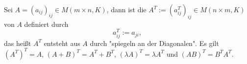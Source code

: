\begin{definition}
	\label{def:I.9.5}
	Sei $A = (a_{ij})_{ij} \in M(m \times n,K)$, dann ist die  $A^T := (a_{ij}^T)_{ij} \in M(n \times m,K)$ von $A$ definiert durch
	\[
		a_{ij}^T := a_{ji},
	\]
	das heißt $A^T$ entsteht aus $A$ durch "spiegeln an der Diagonalen".
	Es gilt $(A^T)^T = A$, $(A+B)^T = A^T + B^T$, $(\lambda A)^T = \lambda A^T$ und $(AB)^T = B^T A^T$.
\end{definition}
\cleardoubleoddemptypage
